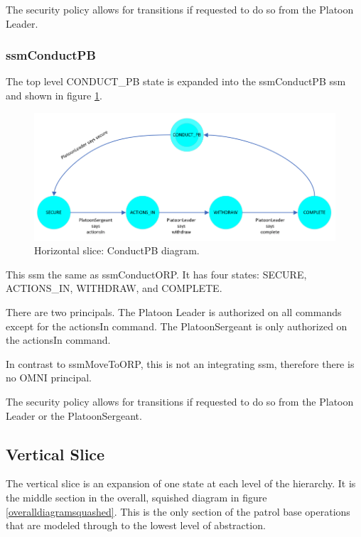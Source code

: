 \documentclass[../../main/main.tex]{subfiles}
\begin{document}
The security policy allows for transitions if requested to do so from the Platoon Leader.  
\clearpage
\subsubsection{ssmConductPB}\label{sssec:ssmConductPB}
The top level CONDUCT_PB state is expanded into the ssmConductPB \gls{ssm} and shown in figure \ref{ssmConductPBDiagram}.

\begin{figure}[h!]
\centering
\includegraphics[width=\textwidth]{../figures/ssmConductPBDiagram}
\caption{\label{ssmConductPBDiagram} Horizontal slice: ConductPB diagram.}
\end{figure}

This \gls{ssm} the same as ssmConductORP.  It has four states: SECURE, ACTIONS_IN, WITHDRAW, and COMPLETE.  

There are two principals.  The Platoon Leader is authorized on all commands except for the actionsIn command.  The PlatoonSergeant is only authorized on the actionsIn command.

In contrast to ssmMoveToORP, this is not an integrating \gls{ssm}, therefore there is no OMNI principal.  

The security policy allows for transitions if requested to do so from the Platoon Leader or the PlatoonSergeant.  



\subsection{Vertical Slice}\label{ssec:verticalslice}
The vertical slice is an expansion of one state at each level of the hierarchy.  It is the middle section in the overall, squished diagram in figure \ref{overalldiagramsquashed}.  This is the only section of the patrol base operations that are modeled through to the lowest level of abstraction.
\end{document}
